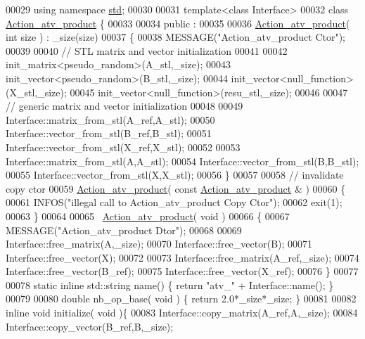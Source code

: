\begin{DoxyCode}
00029 \textcolor{keyword}{using namespace }\hyperlink{namespacestd}{std};
00030 
00031 \textcolor{keyword}{template}<\textcolor{keyword}{class} Interface>
00032 \textcolor{keyword}{class }\hyperlink{class_action__atv__product}{Action\_atv\_product} \{
00033 
00034 public :
00035 
00036   \hyperlink{class_action__atv__product}{Action\_atv\_product}( \textcolor{keywordtype}{int} size ) : \_size(size)
00037   \{
00038     MESSAGE(\textcolor{stringliteral}{"Action\_atv\_product Ctor"});
00039 
00040     \textcolor{comment}{// STL matrix and vector initialization}
00041 
00042     init\_matrix<pseudo\_random>(A\_stl,\_size);
00043     init\_vector<pseudo\_random>(B\_stl,\_size);
00044     init\_vector<null\_function>(X\_stl,\_size);
00045     init\_vector<null\_function>(resu\_stl,\_size);
00046 
00047     \textcolor{comment}{// generic matrix and vector initialization}
00048 
00049     Interface::matrix\_from\_stl(A\_ref,A\_stl);
00050     Interface::vector\_from\_stl(B\_ref,B\_stl);
00051     Interface::vector\_from\_stl(X\_ref,X\_stl);
00052 
00053     Interface::matrix\_from\_stl(A,A\_stl);
00054     Interface::vector\_from\_stl(B,B\_stl);
00055     Interface::vector\_from\_stl(X,X\_stl);
00056   \}
00057 
00058   \textcolor{comment}{// invalidate copy ctor}
00059   \hyperlink{class_action__atv__product}{Action\_atv\_product}( \textcolor{keyword}{const}  \hyperlink{class_action__atv__product}{Action\_atv\_product} & )
00060   \{
00061     INFOS(\textcolor{stringliteral}{"illegal call to Action\_atv\_product Copy Ctor"});
00062     exit(1);
00063   \}
00064 
00065   ~\hyperlink{class_action__atv__product}{Action\_atv\_product}( \textcolor{keywordtype}{void} )
00066   \{
00067     MESSAGE(\textcolor{stringliteral}{"Action\_atv\_product Dtor"});
00068 
00069     Interface::free\_matrix(A,\_size);
00070     Interface::free\_vector(B);
00071     Interface::free\_vector(X);
00072 
00073     Interface::free\_matrix(A\_ref,\_size);
00074     Interface::free\_vector(B\_ref);
00075     Interface::free\_vector(X\_ref);
00076   \}
00077 
00078   \textcolor{keyword}{static} \textcolor{keyword}{inline} std::string name() \{ \textcolor{keywordflow}{return} \textcolor{stringliteral}{"atv\_"} + Interface::name(); \}
00079 
00080   \textcolor{keywordtype}{double} nb\_op\_base( \textcolor{keywordtype}{void} ) \{ \textcolor{keywordflow}{return} 2.0*\_size*\_size; \}
00081 
00082   \textcolor{keyword}{inline} \textcolor{keywordtype}{void} initialize( \textcolor{keywordtype}{void} )\{
00083     Interface::copy\_matrix(A\_ref,A,\_size);
00084     Interface::copy\_vector(B\_ref,B,\_size);

\end{DoxyCode}
